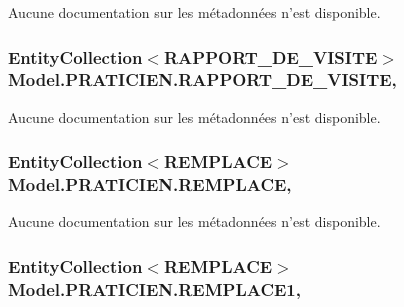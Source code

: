 Aucune documentation sur les métadonnées n'est disponible. 

\hypertarget{class_model_1_1_p_r_a_t_i_c_i_e_n_a75d092c7410cd4c92c2aee3d4cf884a6}{
\subsubsection[{R\-A\-P\-P\-O\-R\-T\-\_\-\-D\-E\-\_\-\-V\-I\-S\-I\-T\-E}]{\setlength{\rightskip}{0pt plus 5cm}Entity\-Collection$<${\bf R\-A\-P\-P\-O\-R\-T\-\_\-\-D\-E\-\_\-\-V\-I\-S\-I\-T\-E}$>$ Model.\-P\-R\-A\-T\-I\-C\-I\-E\-N.\-R\-A\-P\-P\-O\-R\-T\-\_\-\-D\-E\-\_\-\-V\-I\-S\-I\-T\-E\hspace{0.3cm}{\ttfamily [get]}, {\ttfamily [set]}}}\label{class_model_1_1_p_r_a_t_i_c_i_e_n_a75d092c7410cd4c92c2aee3d4cf884a6}


Aucune documentation sur les métadonnées n'est disponible. 

\hypertarget{class_model_1_1_p_r_a_t_i_c_i_e_n_a8ba2a460b9a92f0d33ebeb34a4fa6064}{
\subsubsection[{R\-E\-M\-P\-L\-A\-C\-E}]{\setlength{\rightskip}{0pt plus 5cm}Entity\-Collection$<${\bf R\-E\-M\-P\-L\-A\-C\-E}$>$ Model.\-P\-R\-A\-T\-I\-C\-I\-E\-N.\-R\-E\-M\-P\-L\-A\-C\-E\hspace{0.3cm}{\ttfamily [get]}, {\ttfamily [set]}}}\label{class_model_1_1_p_r_a_t_i_c_i_e_n_a8ba2a460b9a92f0d33ebeb34a4fa6064}


Aucune documentation sur les métadonnées n'est disponible. 

\hypertarget{class_model_1_1_p_r_a_t_i_c_i_e_n_a3f3d71a138657c92174f6452aa7e6a31}{
\subsubsection[{R\-E\-M\-P\-L\-A\-C\-E1}]{\setlength{\rightskip}{0pt plus 5cm}Entity\-Collection$<${\bf R\-E\-M\-P\-L\-A\-C\-E}$>$ Model.\-P\-R\-A\-T\-I\-C\-I\-E\-N.\-R\-E\-M\-P\-L\-A\-C\-E1\hspace{0.3cm}{\ttfamily [get]}, {\ttfamily [set]}}}\label{class_model_1_1_p_r_a_t_i_c_i_e_n_a3f3d71a138657c92174f6452aa7e6a31}


